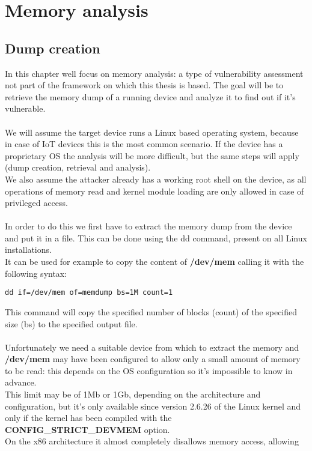 \chapter{Memory analysis}
\section{Dump creation}
In this chapter well focus on memory analysis: a type of vulnerability assessment not part of the framework on which
this thesis is based. The goal will be to retrieve the memory dump of a running device
and analyze it to find out if it's vulnerable.\\\\
We will assume the target device runs a Linux based operating system, because
in case of IoT devices this is the most common scenario. If the device has a
proprietary OS the analysis will be more difficult, but the same steps will apply
(dump creation, retrieval and analysis).\\
We also assume the attacker already has a working root shell on the device,
as all operations of memory read and kernel module loading are only allowed in
case of privileged access.\\\\
In order to do this we first have to extract the memory dump from the device
and put it in a file. This can be done using the dd command, present on all
Linux installations.\\ It can be used for example to copy the content of \textbf{/dev/mem}
calling it with the following syntax:
\begin{lstlisting}[numbers=none]
    dd if=/dev/mem of=memdump bs=1M count=1
\end{lstlisting}
This command will copy the specified number of blocks (count) of the specified
size (bs) to the specified output file.\\\\
Unfortunately we need a suitable device from which to extract the memory and \textbf{/dev/mem}
may have been configured to allow only a small amount of memory to be read:
this depends on the OS configuration so it's impossible to know in advance.\\
This limit may be of 1Mb or 1Gb, depending on the architecture and configuration, but it's only
available since version 2.6.26 of the Linux kernel\cite{dev-mem-man} and only
if the kernel has been compiled with the \textbf{CONFIG\_STRICT\_DEVMEM} option.\\
On the x86 architecture it almost completely disallows memory access, allowing
